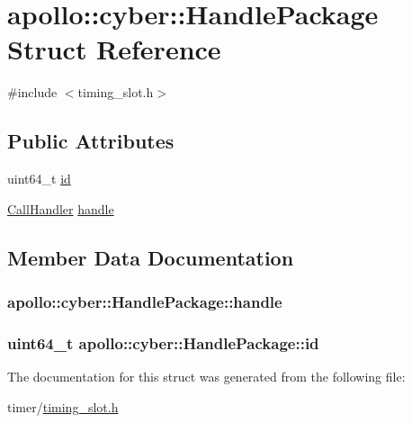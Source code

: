 \hypertarget{structapollo_1_1cyber_1_1HandlePackage}{\section{apollo\-:\-:cyber\-:\-:Handle\-Package Struct Reference}
\label{structapollo_1_1cyber_1_1HandlePackage}
}


{\ttfamily \#include $<$timing\-\_\-slot.\-h$>$}

\subsection*{Public Attributes}
\begin{DoxyCompactItemize}
\item 
uint64\-\_\-t \hyperlink{structapollo_1_1cyber_1_1HandlePackage_a8fc466c98c0f2b17e3d71f7de7083bdd}{id}
\item 
\hyperlink{namespaceapollo_1_1cyber_a73f7b365c4d923725c0a03bfb8c97978}{Call\-Handler} \hyperlink{structapollo_1_1cyber_1_1HandlePackage_afdfaa32a9d2e2260993b781f840af3f3}{handle}
\end{DoxyCompactItemize}


\subsection{Member Data Documentation}
\hypertarget{structapollo_1_1cyber_1_1HandlePackage_afdfaa32a9d2e2260993b781f840af3f3}{
\subsubsection[{handle}]{ apollo\-::cyber\-::\-Handle\-Package\-::handle}}\label{structapollo_1_1cyber_1_1HandlePackage_afdfaa32a9d2e2260993b781f840af3f3}
\hypertarget{structapollo_1_1cyber_1_1HandlePackage_a8fc466c98c0f2b17e3d71f7de7083bdd}{
\subsubsection[{id}]{\setlength{\rightskip}{0pt plus 5cm}uint64\-\_\-t apollo\-::cyber\-::\-Handle\-Package\-::id}}\label{structapollo_1_1cyber_1_1HandlePackage_a8fc466c98c0f2b17e3d71f7de7083bdd}


The documentation for this struct was generated from the following file\-:\begin{DoxyCompactItemize}
\item 
timer/\hyperlink{timing__slot_8h}{timing\-\_\-slot.\-h}\end{DoxyCompactItemize}
